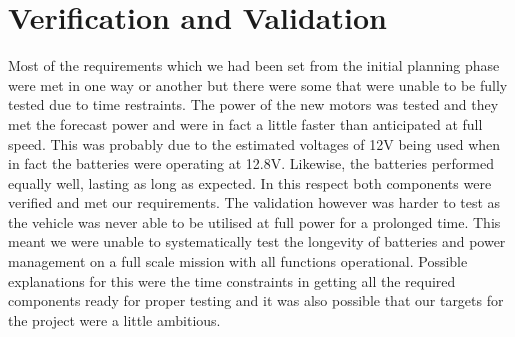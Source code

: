 \section{Verification and Validation}
Most of the requirements which we had been set from the initial planning phase were met in one way or another but there were some that were unable to be fully tested due to time restraints.  
The power of the new motors was tested and they met the forecast power and were in fact a little faster than anticipated at full speed.  This was probably due to the estimated voltages of 12V being used when in fact the batteries were operating at 12.8V.  Likewise, the batteries performed equally well, lasting as long as expected.
In this respect both components were verified and met our requirements.  
\newline
The validation however was harder to test as the vehicle was never able to be utilised at full power for a prolonged time.  This meant we were unable to systematically test the longevity of batteries and power management on a full scale mission with all functions operational.  Possible explanations for this were the time constraints in getting all the required components ready for proper testing and it was also possible that our targets for the project were a little ambitious.  